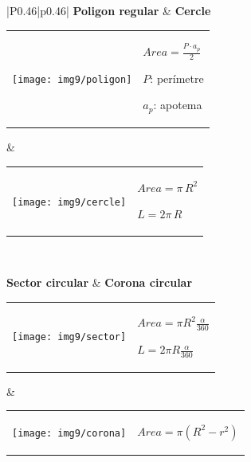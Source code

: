 \begin{center}
\begin{tabular}{|P{0.46\textwidth}|p{0.46\textwidth}|}
			 \textbf{Poligon regular} &   \textbf{Cercle} \\ \hline
		\begin{tabular}{m{}m{}}
			\begin{center} \texttt{[image: img9/poligon]} \end{center} &  \begin{center} 	$Area = \frac{P\cdot a_p}{2}$ \par $P$: perímetre \par $a_p$: apotema   \end{center}
		\end{tabular}
		& 
		\begin{tabular}{m{} m{}}
			\centering \texttt{[image: img9/cercle]} &   \begin{center} $Area = \pi\, R^2$ \par $L=2\pi \, R$ \end{center}
		\end{tabular}
		\\ \hline
		
		
			 \textbf{Sector circular} &   \textbf{Corona circular} \\ \hline
		\begin{tabular}{m{}m{}}
			\begin{center} \texttt{[image: img9/sector]} \end{center} &  \begin{center} 	$Area = \pi R^2 \frac{\alpha}{360}$ \par  $L = 2 \pi R \frac{\alpha}{360}$    \end{center}
		\end{tabular}
		& 
		\begin{tabular}{m{} m{}}
			\centering \texttt{[image: img9/corona]} &   \begin{center} $Area = \pi (R^2-r^2)$ \end{center}
		\end{tabular}
		\\ \hline
	 
		  
	\end{tabular}
\end{center}